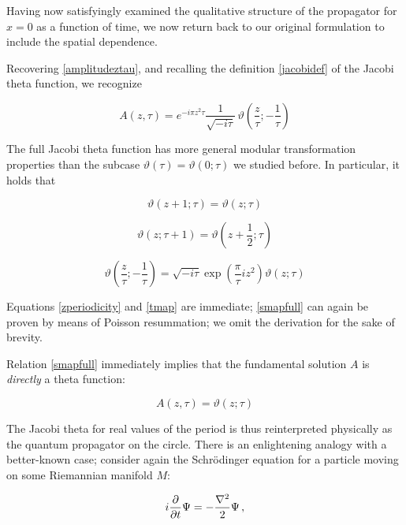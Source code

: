 \documentclass{article}
\newcommand{\T}{\ensuremath{\vartheta}}
\begin{document}
Having now satisfyingly examined the qualitative structure of the propagator for $x=0$ as a function of time, we now return back to our original formulation to include the spatial dependence.

Recovering \eqref{amplitudeztau}, and recalling the definition \eqref{jacobidef} of the Jacobi theta function, we recognize

\begin{equation}
    A(z,\tau) = e^{-i\pi z^2 \tau} \frac{1}{\sqrt{-i\tau}}\, \vartheta\left(\frac{z}{\tau};-\frac{1}{\tau}\right)
\end{equation}

The full Jacobi theta function has more general modular transformation properties than the subcase $\vartheta(\tau) = \vartheta(0;\tau)$ we studied before. In particular, it holds that

\begin{equation} \label{zperiodicity}
    \vartheta(z+1;\tau) = \vartheta(z;\tau)
\end{equation}

\begin{equation} \label{tmap}
    \vartheta(z;\tau + 1) = \vartheta(z+\frac{1}{2}; \tau)
\end{equation}

\begin{equation}\label{smapfull}
    \vartheta\left(\frac{z}{\tau}; -\frac{1}{\tau} \right) = \sqrt{-i\tau} \exp(\frac{\pi}{\tau} i z^2) \T(z;\tau)
\end{equation}

Equations \eqref{zperiodicity} and \eqref{tmap} are immediate; \eqref{smapfull} can again be proven by means of Poisson resummation\cite{thetamodular}; we omit the derivation for the sake of brevity.

Relation \eqref{smapfull} immediately implies that the fundamental solution $A$ is \emph{directly} a theta function:

\begin{equation}
    A(z,\tau) = \vartheta(z;\tau)
\end{equation}

The Jacobi theta for real values of the period is thus reinterpreted physically as the quantum propagator on the circle. There is an enlightening analogy with a better-known case; consider again the Schr\"odinger equation for a particle moving on some Riemannian manifold $M$:

\begin{equation}
    i \pdv{t} \Psi = - \frac{\nabla^2}{2} \Psi\,,
\end{equation}
\end{document}
